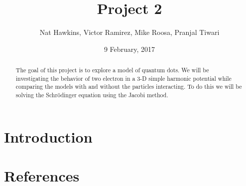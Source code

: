 \documentclass{article}
\title{Project 2}
\author{Nat Hawkins, Victor Ramirez, Mike Roosa, Pranjal Tiwari}
\date{9 February, 2017}
\begin{document}
\maketitle

\begin{abstract}
	The goal of this project is to explore a model of quantum dots. We will be investigating the behavior of two electron in a 3-D simple harmonic potential while comparing the models with and without the particles interacting. To do this we will be solving the Schrödinger equation using the Jacobi method. 
\end{abstract}
\section{Introduction}
\section{References}

\end{document}
